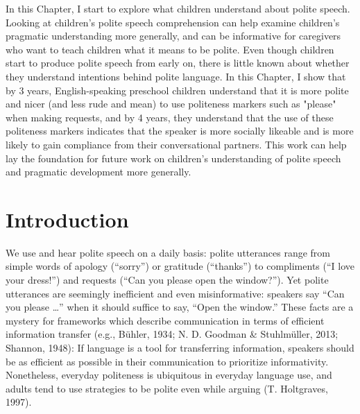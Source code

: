 \documentclass[oneside]{report}
\begin{document}

In this Chapter, I start to explore what children understand about
polite speech. Looking at children's polite speech comprehension can
help examine children's pragmatic understanding more generally, and can
be informative for caregivers who want to teach children what it means
to be polite. Even though children start to produce polite speech from
early on, there is little known about whether they understand intentions
behind polite language. In this Chapter, I show that by 3 years,
English-speaking preschool children understand that it is more polite
and nicer (and less rude and mean) to use politeness markers such as
"please" when making requests, and by 4 years, they understand that the
use of these politeness markers indicates that the speaker is more
socially likeable and is more likely to gain compliance from their
conversational partners. This work can help lay the foundation for
future work on children's understanding of polite speech and pragmatic
development more generally.

\section{Introduction}\label{introduction-1}

We use and hear polite speech on a daily basis: polite utterances range
from simple words of apology (``sorry'') or gratitude (``thanks'') to
compliments (``I love your dress!'') and requests (``Can you please open
the window?''). Yet polite utterances are seemingly inefficient and even
misinformative: speakers say ``Can you please \ldots{}'' when it should
suffice to say, ``Open the window.'' These facts are a mystery for
frameworks which describe communication in terms of efficient
information transfer (e.g., Bühler, 1934; N. D. Goodman \& Stuhlmüller,
2013; Shannon, 1948): If language is a tool for transferring
information, speakers should be as efficient as possible in their
communication to prioritize informativity. Nonetheless, everyday
politeness is ubiquitous in everyday language use, and adults tend to
use strategies to be polite even while arguing (T. Holtgraves, 1997).
\end{document}
